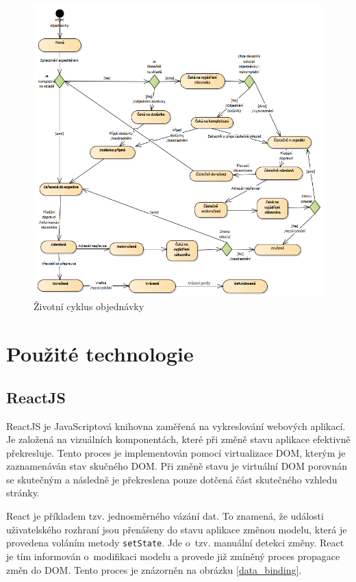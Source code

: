 \documentclass[thesis=B,czech]{FITthesis}[2012/06/26]
\begin{document}
\begin{figure}
	\includegraphics[width=\textwidth]{order_cycle.png}
	\caption{Životní cyklus objednávky}\label{oredr_cycle}
\end{figure}


\section{Použité technologie}

\subsection{ReactJS}
	ReactJS\cite{reactjs} je JavaScriptová knihovna zaměřená na vykreslování webových aplikací. Je založená na vizuálních komponentách, které při změně stavu aplikace efektivně překresluje. Tento proces je implementován pomocí virtualizace DOM, kterým je zaznamenáván stav skučného DOM. Při změně stavu je virtuální DOM porovnán se skutečným a následně je překreslena pouze dotčená část skutečného vzhledu stránky. \cite{react-crud-app}

	React je příkladem tzv. jednosměrného vázání dat. To znamená, že události uživatelského rozhraní jsou přenášeny do stavu aplikace   změnou modelu, která je provedena voláním metody \verb|setState|. Jde o~tzv. manuální detekci změny. React je tím informován o~modifikaci modelu a provede již zmíněný proces propagace změn do DOM.\cite{data_binding} Tento proces je znázorněn na obrázku \ref{data_binding}.
\end{document}
